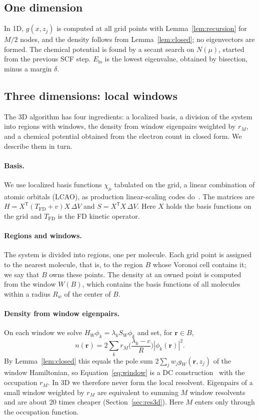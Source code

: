 \documentclass[aps,prb,twocolumn,superscriptaddress,floatfix,longbibliography]{revtex4-2}
\theoremstyle{remark}
\begin{document}
\subsection{One dimension}

In 1D, $g(x,z_j)$ is computed at all grid points with Lemma~\ref{lem:recursion} for $M/2$ nodes, and the density follows
from Lemma~\ref{lem:closed}; no eigenvectors are formed. The chemical potential is found by a secant search on $N(\mu)$,
started from the previous SCF step. $E_\mathrm{lo}$ is the lowest eigenvalue, obtained by bisection, minus a margin
$\delta$.

\subsection{Three dimensions: local windows}\label{sec:windows}

The 3D algorithm has four ingredients: a localized basis, a division of the system into regions with windows, the density
from window eigenpairs weighted by $r_M$, and a chemical potential obtained from the electron count in closed form. We
describe them in turn.

\paragraph*{Basis.} We use localized basis functions $\chi_\mu$ tabulated on the grid, a linear combination of atomic orbitals
(LCAO), as production linear-scaling codes do~\cite{SIESTA2002,ONETEP2005}. The matrices are
$H=X^{\mathsf T}(T_\mathrm{FD}+v)X\,\Delta V$ and $S=X^{\mathsf T}X\,\Delta V$. Here $X$ holds the basis functions on the grid
and $T_\mathrm{FD}$ is the FD kinetic operator.

\paragraph*{Regions and windows.} The system is divided into regions, one per molecule. Each grid point is assigned to the
nearest molecule, that is, to the region $B$ whose Voronoi cell contains it; we say that $B$ owns these points. The density at
an owned point is computed from the window $W(B)$, which contains the basis functions of all molecules within a radius $R_w$
of the center of $B$.

\paragraph*{Density from window eigenpairs.} On each window we solve $H_W\phi_k=\lambda_kS_W\phi_k$ and set, for
$\bm r\in B$,
\begin{equation}
n(\bm r)=2\sum_kr_M\Big(\frac{\lambda_k-c}{R}\Big)|\phi_k(\bm r)|^2 .
\label{eq:window}
\end{equation}
By Lemma~\ref{lem:closed} this equals the pole sum $2\sum_jw_jg_W(\bm r,z_j)$ of the window Hamiltonian, so
Equation~\eqref{eq:window} is a DC construction~\cite{Yang1991} with the occupation $r_M$. In 3D we therefore never form the
local resolvent. Eigenpairs of a small window weighted by $r_M$ are equivalent to summing $M$ window resolvents and are about
20 times cheaper (Section~\ref{sec:res3d}). Here $M$ enters only through the occupation function.
\end{document}
